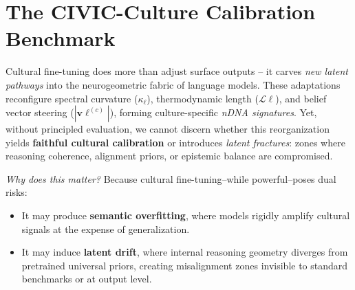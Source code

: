 

\section{The CIVIC-Culture Calibration Benchmark}
\label{sec:aether_benchmark}

Cultural fine-tuning does more than adjust surface outputs -- it carves \emph{new latent pathways} into the neurogeometric fabric of language models. These adaptations reconfigure spectral curvature ($\kappa_\ell$), thermodynamic length ($\mathcal{L}\ell$), and belief vector steering ($|\mathbf{v}\ell^{(c)}|$), forming culture-specific \emph{nDNA signatures}. Yet, without principled evaluation, we cannot discern whether this reorganization yields \textbf{faithful cultural calibration} or introduces \emph{latent fractures}: zones where reasoning coherence, alignment priors, or epistemic balance are compromised.

\vspace{0.3em}

\noindent
\emph{Why does this matter?} Because cultural fine-tuning--while powerful--poses dual risks:
\begin{itemize}[leftmargin=1.5em]
\item It may produce \textbf{semantic overfitting}, where models rigidly amplify cultural signals at the expense of generalization.
\item It may induce \textbf{latent drift}, where internal reasoning geometry diverges from pretrained universal priors, creating misalignment zones invisible to standard benchmarks or at output level.
\end{itemize}

\vspace{0.3em}

